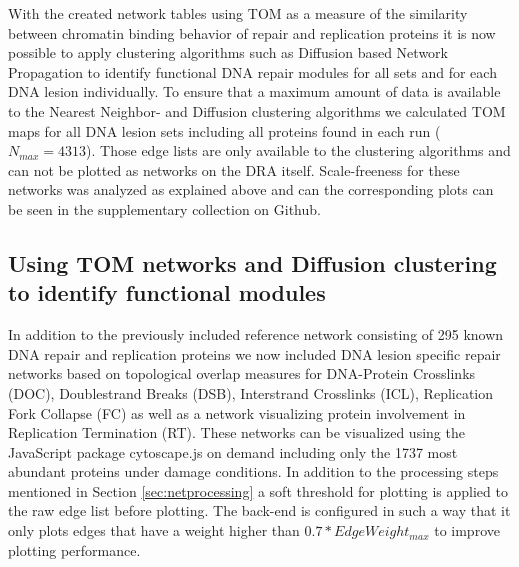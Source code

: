 With the created network tables using TOM as a measure of the similarity between chromatin binding behavior of repair and replication proteins it is now possible to apply clustering algorithms such as Diffusion based Network Propagation to identify functional DNA repair modules for all sets and for each DNA lesion individually. To ensure that a maximum amount of data is available to the Nearest Neighbor- and Diffusion clustering algorithms we calculated TOM maps for all DNA lesion sets including all proteins found in each run ($N_{max}=4313$). Those edge lists are only available to the clustering algorithms and can not be plotted as networks on the DRA itself. Scale-freeness for these networks was analyzed as explained above and can the corresponding plots can be seen in the supplementary collection on Github.


\subsection{Using TOM networks and Diffusion clustering to identify functional modules}
In addition to the previously included reference network consisting of 295 known DNA repair and replication proteins we now included DNA lesion specific repair networks based on topological overlap measures for DNA-Protein Crosslinks (DOC), Doublestrand Breaks (DSB), Interstrand Crosslinks (ICL), Replication Fork Collapse (FC) as well as a network visualizing protein involvement in Replication Termination (RT). These networks can be visualized using the JavaScript package cytoscape.js on demand including only the 1737 most abundant proteins under damage conditions. In addition to the processing steps mentioned in Section \ref{sec:netprocessing} a soft threshold for plotting is applied to the raw edge list before plotting. The back-end is configured in such a way that it only plots edges that have a weight higher than $0.7 * EdgeWeight_{max}$ to improve plotting performance.\\
